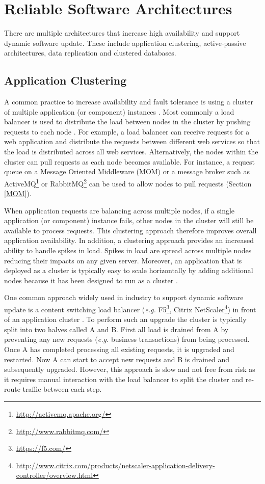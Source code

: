 \documentclass[a4paper,11pt,twoside]{report}
\begin{document}
\section{Reliable Software Architectures} \label{Architectures}
There are multiple architectures that increase high availability and support dynamic software update. These include application clustering, active-passive architectures, data replication and clustered databases.

\subsection{Application Clustering}
A common practice to increase availability and fault tolerance is using a cluster of multiple application (or component) instances \cite{Clustring}. Most commonly a load balancer is used to distribute the load between nodes in the cluster by pushing requests to each node \cite{balancer}. For example, a load balancer can receive requests for a web application and distribute the requests between different web services so that the load is distributed across all web services. Alternatively, the nodes within the cluster can pull requests as each node becomes available. For instance, a request queue on a Message Oriented Middleware (MOM) or a message broker such as ActiveMQ\footnote{\url{http://activemq.apache.org/}} or RabbitMQ\footnote{ \url{http://www.rabbitmq.com/}} can be used to allow nodes to pull requests (Section \ref{MOM}).

When application requests are balancing across multiple nodes, if a single application (or component) instance fails, other nodes in the cluster will still be available to process requests. This clustering approach therefore improves overall application availability. In addition, a clustering approach provides an increased ability to handle spikes in load. Spikes in load are spread across multiple nodes reducing their impacts on any given server. Moreover, an application that is deployed as a cluster is typically easy to scale horizontally by adding additional nodes because it has been designed to run as a cluster \cite{Clustring}.

One common approach widely used in industry to support dynamic software update is a content switching load balancer (\textit{e.g.} F5\footnote{\url{https://f5.com/}}, Citrix  NetScaler\footnote{\url{http://www.citrix.com/products/netscaler-application-delivery-controller/overview.html}}) in front of an application cluster \cite{balancer}. To perform such an upgrade the cluster is typically split into two halves called A and B. First all load is drained from A by preventing any new requests (\textit{e.g.} business transactions) from being processed. Once A has completed processing all existing requests, it is upgraded and restarted. Now A can start to accept new requests and B is drained and subsequently upgraded. However, this approach is slow and not free from risk as it requires manual interaction with the load balancer to split the cluster and re-route traffic between each step.
\end{document}

